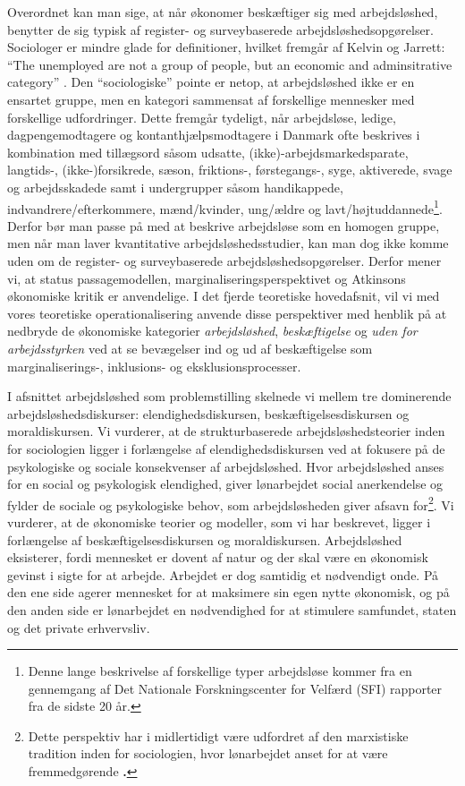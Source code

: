Overordnet kan man sige, at når økonomer beskæftiger sig med arbejdsløshed, benytter de sig typisk af register- og surveybaserede arbejdsløshedsopgørelser. Sociologer er mindre glade for definitioner, hvilket fremgår af Kelvin og Jarrett: “The unemployed are not a group of people, but an economic and adminsitrative category” \parencite{Kelvin1985}. Den “sociologiske” pointe er netop, at arbejdsløshed ikke er en ensartet gruppe, men en kategori sammensat af forskellige mennesker med forskellige udfordringer. Dette fremgår tydeligt, når arbejdsløse, ledige, dagpengemodtagere og kontanthjælpsmodtagere i Danmark ofte beskrives i kombination med tillægsord såsom udsatte, (ikke)-arbejdsmarkedsparate, langtids-, (ikke-)forsikrede, sæson, friktions-, førstegangs-, syge, aktiverede, svage og arbejdsskadede samt i undergrupper såsom handikappede, indvandrere/efterkommere, mænd/kvinder, ung/ældre og lavt/højtuddannede\footnote{Denne lange beskrivelse af forskellige typer arbejdsløse kommer fra en gennemgang af Det Nationale Forskningscenter for Velfærd (SFI) rapporter fra de sidste 20 år.}. Derfor bør man passe på med at beskrive arbejdsløse som en homogen gruppe, men når man laver kvantitative arbejdsløshedsstudier, kan man dog ikke komme uden om de register- og surveybaserede arbejdsløshedsopgørelser. Derfor mener vi, at status passagemodellen, marginaliseringsperspektivet og Atkinsons økonomiske kritik er anvendelige. I det fjerde teoretiske hovedafsnit, vil vi med vores teoretiske operationalisering anvende disse perspektiver med henblik på at nedbryde de økonomiske kategorier \textit{arbejdsløshed}, \textit{beskæftigelse} og \textit{uden for arbejdsstyrken} ved at se bevægelser ind og ud af beskæftigelse som marginaliserings-, inklusions- og eksklusionsprocesser.

I afsnittet arbejdsløshed som problemstilling skelnede vi mellem tre dominerende arbejdsløshedsdiskurser: elendighedsdiskursen, beskæftigelsesdiskursen og moraldiskursen. Vi vurderer, at de strukturbaserede arbejdsløshedsteorier inden for sociologien ligger i forlængelse af elendighedsdiskursen ved at fokusere på de psykologiske og sociale konsekvenser af arbejdsløshed. Hvor arbejdsløshed anses for en social og psykologisk elendighed, giver lønarbejdet social anerkendelse og fylder de sociale og psykologiske behov, som arbejdsløsheden giver afsavn for\footnote{Dette perspektiv har i midlertidigt være udfordret af den marxistiske tradition inden for sociologien, hvor lønarbejdet anset for at være fremmedgørende \textbf{\parencite[48]{Halvorsen1999}.}}. Vi vurderer, at de økonomiske teorier og modeller, som vi har beskrevet, ligger i forlængelse af beskæftigelsesdiskursen og moraldiskursen. Arbejdsløshed eksisterer, fordi mennesket er dovent af natur og der skal være en økonomisk gevinst i sigte for at arbejde. Arbejdet er dog samtidig et nødvendigt onde. På den ene side agerer mennesket for at maksimere sin egen nytte økonomisk, og på den anden side er lønarbejdet en nødvendighed for at stimulere samfundet, staten og det private erhvervsliv.

